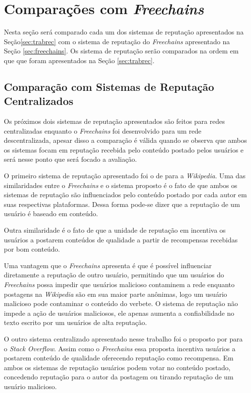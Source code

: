 \documentclass[12pt]{article}
\newcommand{\FC} {\emph{Freechains}\xspace}
\begin{document}
\section{Comparações com \FC} \label{sec:comparacao}

Nesta seção será comparado cada um dos sistemas de reputação apresentados na Seção\ref{sec:trabrec} com o sistema de reputação do \FC apresentado na Seção \ref{sec:freechains}. Os sistema de reputação serão comparados na ordem em que que foram apresentados na Seção \ref{sec:trabrec}.

\subsection{Comparação com Sistemas de Reputação Centralizados} \label{subsec:CompSRC}

Os próximos dois sistemas de reputação apresentados são feitos para redes centralizadas enquanto o \FC foi desenvolvido para um rede descentralizada, apesar disso a comparação é válida quando se observa que ambos os sistemas focam em reputação recebida pelo conteúdo postado pelos usuários e será nesse ponto que será focado a avaliação.

O primeiro sistema de reputação apresentado foi o de \cite{adler2007content} para a \emph{Wikipedia}. Uma das similaridades entre o \FC e o sistema proposto é o fato de que ambos os sistemas de reputação são influenciados pelo conteúdo postado por cada autor em suas respectivas plataformas. Dessa forma pode-se dizer que a reputação de um usuário é baseado em conteúdo.

Outra similaridade é o fato de que a unidade de reputação em \cite{adler2007content} incentiva os usuários a postarem conteúdos de qualidade a partir de recompensas recebidas por bom conteúdo.

Uma vantagem que o \FC apresenta é que é possível influenciar diretamente a reputação de outro usuário, permitindo que um usuários do \FC possa impedir que usuários malicioso contaminem a rede enquanto postagens na \emph{Wikipedia} são em sua maior parte anônimas, logo um usuário malicioso pode contaminar o conteúdo do verbete. O sistema de reputação não impede a ação de usuários maliciosos, ele apenas aumenta a confiabilidade no texto escrito por um usuários de alta reputação.

O outro sistema centralizado apresentado nesse trabalho foi o proposto por \cite{huna2016exploiting} para o \emph{Stack Overflow}. Assim como o \FC essa proposta incentiva usuários a postarem conteúdo de qualidade oferecendo reputação como recompensa. Em ambos os sistemas de reputação usuários podem votar no conteúdo postado, concedendo reputação para o autor da postagem ou tirando reputação de um usuário malicioso. 
\end{document}
